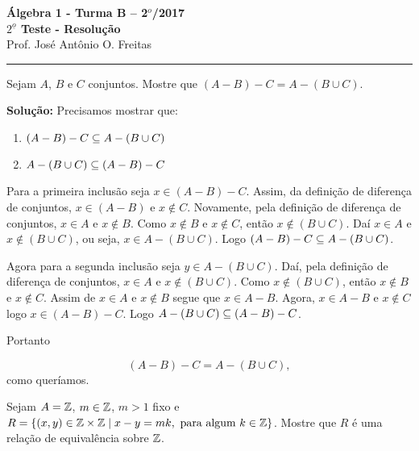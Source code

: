 \documentclass[12pt]{article}
\begin{document}


\begin{center}
{\Large\bf {\'A}lgebra 1 - Turma B -- 2$^{o}$/2017} \\ \vspace{9pt} {\large\bf
  $2^{\underline{o}}$ Teste - Resolu\c{c}\~ao}\\
\vspace{9pt} Prof. Jos{\'e} Ant{\^o}nio O. Freitas
\end{center}
\hrule

\vspace{.6cm}


\vspace{.6cm}

\questao Sejam $A$, $B$ e $C$ conjuntos. Mostre que $(A - B) - C = A - (B \cup C)$.

\noindent\textbf{Solu\c{c}\~ao:} Precisamos mostrar que:
\begin{enumerate}
	\item $(A - B) - C \subseteq A - (B \cup C)$
	\item $A - (B \cup C) \subseteq (A - B) - C$
\end{enumerate}

Para a primeira inclusão seja $x \in (A - B) - C$. Assim, da definição de diferença de conjuntos, $x \in (A - B)$ e $x \notin C$. Novamente, pela definição de diferença de conjuntos, $x \in A$ e $x \notin B$. Como $x \notin B$ e $x \notin C$, então $x \notin (B \cup C)$. Daí $x \in A$ e $x \notin (B \cup C)$, ou seja, $x \in A - (B \cup C)$. Logo $(A - B) - C \subseteq A - (B \cup C)$.

Agora para a segunda inclusão seja $y \in A - (B \cup C)$. Daí, pela definição de diferença de conjuntos, $x \in A$ e $x \notin (B \cup C)$. Como $x \notin (B \cup C)$, então $x \notin B$ e $x \notin C$. Assim de $x \in A$ e $x \notin B$ segue que $x \in A - B$. Agora, $x \in A - B$ e $x \notin C$ logo $x \in (A - B) - C$. Logo $A - (B \cup C) \subseteq (A - B) - C$.

Portanto

\[
	(A - B) - C = A - (B \cup C),
\]
como queríamos.

\vspace{.5cm}

\questao Sejam $A = \mathbb{Z}$, $m \in \mathbb{Z}$, $m > 1$ fixo e $R = \{(x,y)\in \mathbb{Z} \times \mathbb{Z} \mid x - y = mk, \mbox{ para algum } k \in \mathbb{Z}\}$. Mostre que $R$
é uma rela{\c c}{\~a}o de equival{\^e}ncia sobre $\mathbb{Z}$.
\end{document}
